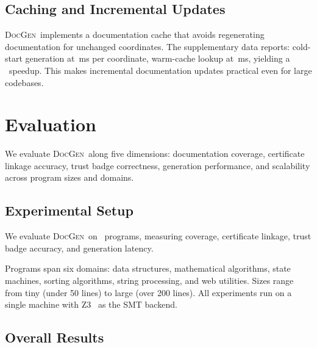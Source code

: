 \documentclass[11pt]{article}
\newcommand{\DocGen}{\textsc{DocGen}}
\begin{document}
\subsection{Caching and Incremental Updates}
\DocGen\ implements a documentation cache that avoids regenerating
documentation for unchanged coordinates.  The supplementary data reports:
cold-start generation at \suppColdMeanMs\,ms per coordinate, warm-cache
lookup at \suppWarmMeanMs\,ms, yielding a \suppCacheSpeedup\ speedup.
This makes incremental documentation updates practical even for large
codebases.

\section{Evaluation}\label{sec:evaluation}

We evaluate \DocGen\ along five dimensions: documentation coverage,
certificate linkage accuracy, trust badge correctness, generation
performance, and scalability across program sizes and domains.

\subsection{Experimental Setup}
We evaluate \DocGen\ on \ppLIXtotalPrograms\ programs,
measuring coverage, certificate linkage,
trust badge accuracy, and generation latency.

Programs span six domains: data structures, mathematical algorithms,
state machines, sorting algorithms, string processing, and web
utilities.  Sizes range from tiny (under 50 lines) to large (over
200 lines).  All experiments run on a single machine with Z3~\cite{Z32008}
as the SMT backend.

\subsection{Overall Results}
\end{document}
